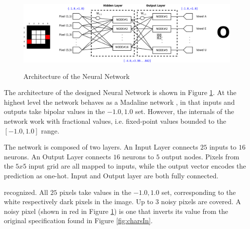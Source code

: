 \begin{figure}
    \centering
    \includegraphics[width=\textwidth]{images/Architecture.png}
    \label{fig:netArchi}
    \caption{Architecture of the Neural Network}
\end{figure}
The architecture of the designed Neural Network is shown in Figure \ref{fig:netArchi}. At the
highest level the network behaves as a Madaline network \cite{23872}, in that inputs and outputs
take bipolar values in the ${-1.0, 1.0}$ set. However, the internals of the network work with
fractional values, i.e. fixed-point values bounded to the $[-1.0,1.0]$ range.

The network is composed of two layers. An Input Layer connects $25$ inputs to $16$ neurons. An
Output Layer connects $16$ neurons to $5$ output nodes. Pixels from the $5x5$ input grid are all
mapped to inputs, while the output vector encodes the prediction as one-hot. Input and Output layer
are both fully connected.

recognized. All $25$ pixels take values in the ${-1.0,1.0}$ set, corresponding to the white
respectively dark pixels in the image. Up to $3$ noisy pixels are covered. A noisy pixel (shown in
red in Figure \ref{fig:netArchi}) is one that inverts its value from the original specification
found in Figure \ref{fig:charsIn}.
